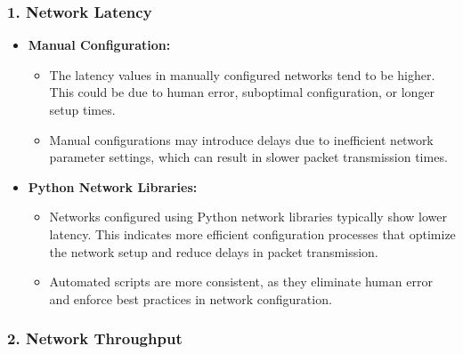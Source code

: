 \documentclass[11pt]{article}
\providecommand{\tightlist}{%
      \setlength{\itemsep}{0pt}\setlength{\parskip}{0pt}}
\begin{document}
\hypertarget{network-latency}{%
\subsubsection{\texorpdfstring{1. \textbf{Network
Latency}}{1. Network Latency}}\label{network-latency}}

\begin{itemize}
\tightlist
\item
  \textbf{Manual Configuration:}

  \begin{itemize}
  \tightlist
  \item
    The latency values in manually configured networks tend to be
    higher. This could be due to human error, suboptimal configuration,
    or longer setup times.
  \item
    Manual configurations may introduce delays due to inefficient
    network parameter settings, which can result in slower packet
    transmission times.
  \end{itemize}
\item
  \textbf{Python Network Libraries:}

  \begin{itemize}
  \tightlist
  \item
    Networks configured using Python network libraries typically show
    lower latency. This indicates more efficient configuration processes
    that optimize the network setup and reduce delays in packet
    transmission.
  \item
    Automated scripts are more consistent, as they eliminate human error
    and enforce best practices in network configuration.
  \end{itemize}
\end{itemize}

\hypertarget{network-throughput}{%
\subsubsection{\texorpdfstring{2. \textbf{Network
Throughput}}{2. Network Throughput}}\label{network-throughput}}
\end{document}
